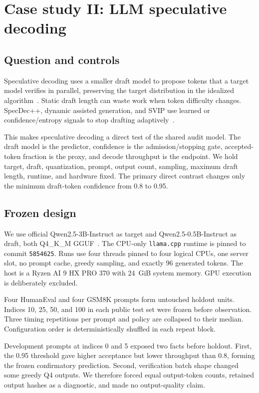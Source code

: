 \documentclass[conference]{IEEEtran}
\begin{document}
\section{Case study II: LLM speculative decoding}
\subsection{Question and controls}
Speculative decoding uses a smaller draft model to propose tokens that a target
model verifies in parallel, preserving the target distribution in the
idealized algorithm~\cite{leviathan,chen}. Static draft length can waste work
when token difficulty changes. SpecDec++, dynamic assisted generation, and
SVIP use learned or confidence/entropy signals to stop drafting
adaptively~\cite{specdecpp,hfdynamic,svip}.

This makes speculative decoding a direct test of the shared audit model. The
draft model is the predictor, confidence is the admission/stopping gate,
accepted-token fraction is the proxy, and decode throughput is the endpoint.
We hold target, draft, quantization, prompt, output count, sampling, maximum
draft length, runtime, and hardware fixed. The primary direct contrast changes
only the minimum draft-token confidence from 0.8 to 0.95.

\subsection{Frozen design}
We use official Qwen2.5-3B-Instruct as target and Qwen2.5-0.5B-Instruct as
draft, both Q4\_K\_M GGUF~\cite{qwen}. The CPU-only \texttt{llama.cpp}
runtime is pinned to commit \texttt{5854625}. Runs use four threads pinned to
four logical CPUs, one server slot, no prompt cache, greedy sampling, and
exactly 96 generated tokens. The host is a Ryzen AI 9 HX PRO 370 with 24~GiB
system memory. GPU execution is deliberately excluded.

Four HumanEval and four GSM8K prompts form untouched holdout units. Indices 10,
25, 50, and 100 in each public test set were frozen before observation. Three
timing repetitions per prompt and policy are collapsed to their median.
Configuration order is deterministically shuffled in each repeat block.

Development prompts at indices 0 and 5 exposed two facts before holdout. First,
the 0.95 threshold gave higher acceptance but lower throughput than 0.8,
forming the frozen confirmatory prediction. Second, verification batch shape
changed some greedy Q4 outputs. We therefore forced equal output-token counts,
retained output hashes as a diagnostic, and made no output-quality claim.
\end{document}
